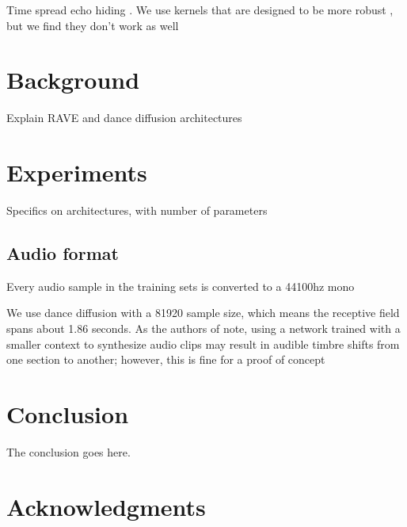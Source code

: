 \documentclass[lettersize,journal]{IEEEtran}
\begin{document}
Time spread echo hiding \cite{ko2005time}.  We use kernels that are designed to be more robust \cite{xiang2010effective}, but we find they don't work as well


\section{Background}

Explain RAVE and dance diffusion architectures

\section{Experiments}

Specifics on architectures, with number of parameters

\subsection{Audio format}
Every audio sample in the training sets is converted to a 44100hz mono 

We use dance diffusion with a 81920 sample size, which means the receptive field spans about 1.86 seconds.  As the authors of \cite{hawthornemulti} note, using a network trained with a smaller context to synthesize audio clips may result in audible timbre shifts from one section to another; however, this is fine for a proof of concept


\section{Conclusion}
The conclusion goes here.


\section*{Acknowledgments}








\end{document}
